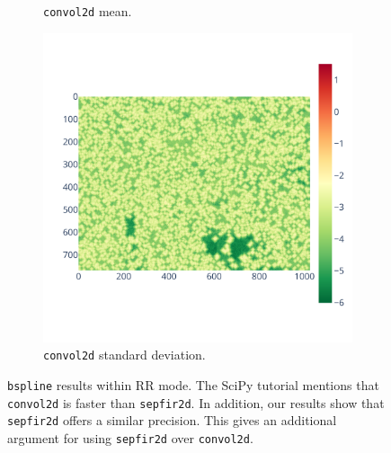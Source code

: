 \documentclass[11pt]{article}
\newcommand{\tristan}[1]{\color{orange}\textbf{From Tristan:} #1\color{black}\xspace}
\begin{document}
\begin{figure}
\begin{subfigure}{0.3\linewidth}
    \caption{\texttt{convol2d} mean.}
    \label{fig:bspline_convol2d_mean}
\end{subfigure}
\begin{subfigure}{0.3\linewidth}
    \includegraphics[width=\linewidth]{figure/bspline/convol2d_std_log.pdf}
    \caption{\texttt{convol2d} standard deviation.}
    \label{fig:bspline_convol2d_std}
\end{subfigure}
    \caption{\texttt{bspline} results within RR mode.
    The SciPy tutorial mentions that \texttt{convol2d} is faster than \texttt{sepfir2d}.
    In addition, our results show that \texttt{sepfir2d} offers a similar precision.
    This gives an additional argument for using \texttt{sepfir2d} over \texttt{convol2d}.
    }
    \label{fig:bspline_rr}
\end{figure}
\end{document}
